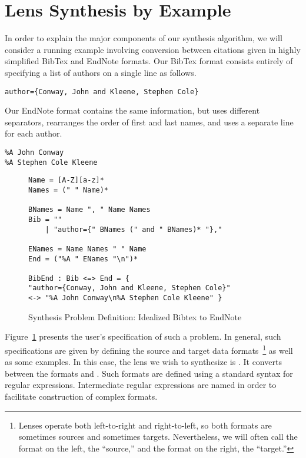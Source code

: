 \section{Lens Synthesis by Example}


In order to explain the major components of our synthesis algorithm,
we will consider a running example involving conversion between citations given
in highly simplified BibTex and EndNote formats.  Our BibTex format
consists entirely of specifying a list of authors on a single line as follows.
\begin{lstlisting}
author={Conway, John and Kleene, Stephen Cole}
\end{lstlisting}
Our EndNote format contains the same information, but uses different separators,
rearranges the order of first and last names, and uses a separate line for each
author. 
\begin{lstlisting}
%A John Conway
%A Stephen Cole Kleene
\end{lstlisting}

\begin{figure}
\begin{lstlisting}
Name = [A-Z][a-z]*
Names = (" " Name)*

BNames = Name ", " Name Names
Bib = ""
    | "author={" BNames (" and " BNames)* "},"

ENames = Name Names " " Name
End = ("%A " ENames "\n")*

BibEnd : Bib <=> End = {
"author={Conway, John and Kleene, Stephen Cole}"
<-> "%A John Conway\n%A Stephen Cole Kleene" }
\end{lstlisting}
\caption{Synthesis Problem Definition: Idealized Bibtex to EndNote}
\label{fig:bibend-spec}
\end{figure}

Figure~\ref{fig:bibend-spec} presents
the user's specification of such a problem.  In general, such specifications are
given by defining the source and target data formats~\footnote{Lenses
operate both left-to-right and right-to-left, so both formats are sometimes
sources and sometimes targets. Nevertheless, we will often call the
format on the left, the ``source,'' and the format on the right, 
the ``target.''} as well as some examples.  In this case, the lens
we wish to synthesize is .  It converts between 
the formats  and .
Such formats are defined using a standard syntax for regular expressions.
Intermediate regular expressions are named in order to facilitate
construction of complex formats.

